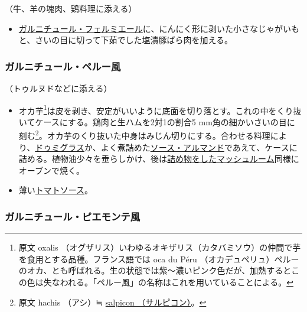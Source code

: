 \begin{recette}
（牛、羊の塊肉、鶏料理に添える）

\begin{itemize}
\tightlist
\item
  \protect\hyperlink{garniture-a-la-fermiere}{ガルニチュール・フェルミエール}に、にんにく形に剥いた小さなじゃがいもと、さいの目に切って下茹でした塩漬豚ばら肉を加える。
\end{itemize}

\hypertarget{garniture-a-la-peruvienne}{%
\subsubsection{ガルニチュール・ペルー風}\label{garniture-a-la-peruvienne}}



（トゥルヌドなどに添える）

\begin{itemize}
\item
  オカ芋\footnote{原文 oxalis
    （オグザリス）いわゆるオキザリス（カタバミソウ）の仲間で芋を食用とする品種。フランス語では
    oca du Péru
    （オカデュペリュ）ペルーのオカ、とも呼ばれる。生の状態では紫〜濃いピンク色だが、加熱するとこの色は失なわれる。「ペルー風」の名称はこれを用いていることによる。}は皮を剥き、安定がいいように底面を切り落とす。これの中をくり抜いてケースにする。鶏肉と生ハムを2対1の割合5
  mm角の細かいさいの目に刻む\footnote{原文 hachis （アシ）≒
    \protect\hyperlink{salpicons-divers}{salpicon （サルピコン）}。}。オカ芋のくり抜いた中身はみじん切りにする。合わせる料理により、\protect\hyperlink{sauce-demi-glace}{ドゥミグラス}か、よく煮詰めた\protect\hyperlink{sauce-allemande}{ソース・アルマンド}であえて、ケースに詰める。植物油少々を垂らしかけ、後は\protect\hyperlink{champignons-farcis}{詰め物をしたマッシュルーム}同様にオーブンで焼く。
\item
  薄い\protect\hyperlink{sauce-tomate}{トマトソース}。
\end{itemize}

\hypertarget{garniture-a-la-piemontaise}{%
\subsubsection{ガルニチュール・ピエモンテ風}\label{garniture-a-la-piemontaise}}


\end{recette}
